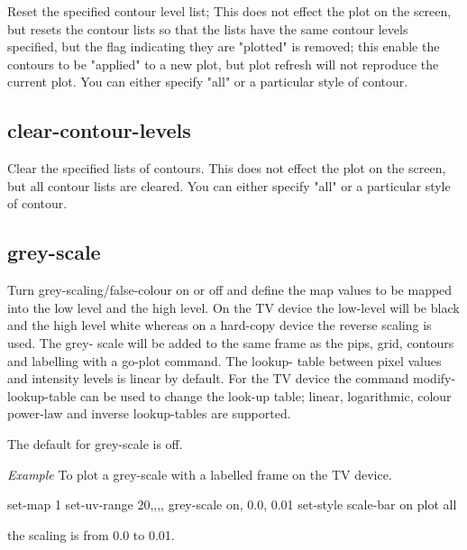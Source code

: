 
Reset the specified contour level list; This does not effect
the plot on the screen, but resets the contour lists so that
the lists have the same contour levels specified, but the
flag indicating they are "plotted" is removed; this enable the
contours to be "applied" to a new plot, but plot refresh will
not reproduce the current plot.  You can either specify "all"
or a particular style of contour.

\subsection{clear-contour-levels}


Clear the specified lists of contours.  This does not effect
the plot on the screen, but all contour lists are cleared.
You can either specify "all" or a particular style of contour.

\subsection{grey-scale}


Turn grey-scaling/false-colour on or off and define the map values
to be mapped into the low level and the high level. On the TV device
the low-level will be black and the high level white whereas
on a hard-copy device the reverse scaling is used. The grey-
scale will be added to the same frame as the pips, grid,
contours and labelling with a go-plot command. The lookup-
table between pixel values and intensity levels is linear by
default. For the TV device the command modify-lookup-table can
be used to change the look-up table; linear, logarithmic,
colour power-law and inverse lookup-tables are supported.


The default for grey-scale is off.

{\large\em Example}
\newline
To plot a grey-scale with a labelled frame on the TV device.

      set-map 1
      set-uv-range 20,,,,
      grey-scale on, 0.0, 0.01
      set-style scale-bar on
      plot all

the scaling is from 0.0 to 0.01.

